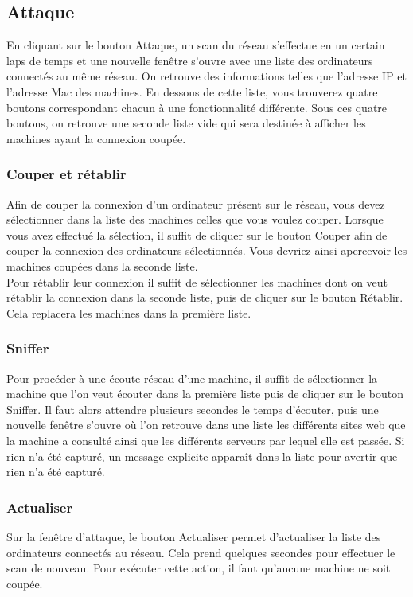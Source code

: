 \documentclass[11pt]{article}
\begin{document}
\subsection{Attaque}
En cliquant sur le bouton Attaque, un scan du réseau s'effectue en un certain laps de temps et une nouvelle fenêtre s'ouvre avec une liste des ordinateurs connectés au même réseau. On retrouve des informations telles que l'adresse IP et l'adresse Mac des machines. En dessous de cette liste, vous trouverez quatre boutons  correspondant chacun à une fonctionnalité différente. Sous ces quatre boutons, on retrouve une seconde liste vide qui sera destinée à afficher les machines ayant la connexion coupée.
\subsubsection{Couper et rétablir}
Afin de couper la connexion d'un ordinateur présent sur le réseau, vous devez sélectionner dans la liste des machines celles que vous voulez couper. Lorsque vous avez effectué la sélection, il suffit de cliquer sur le bouton Couper afin de couper la connexion des ordinateurs sélectionnés. Vous devriez ainsi apercevoir les machines coupées dans la seconde liste.~\\
Pour rétablir leur connexion il suffit de sélectionner les machines dont on veut rétablir la connexion dans la seconde liste, puis de cliquer sur le bouton Rétablir. Cela replacera les machines dans la première liste.

\subsubsection{Sniffer}
Pour procéder à une écoute réseau d'une machine, il suffit de sélectionner la machine que l'on veut écouter dans la première liste puis de cliquer sur le bouton Sniffer. Il faut alors attendre plusieurs secondes le temps d'écouter, puis une nouvelle fenêtre s'ouvre où l'on retrouve dans une liste les différents sites web que la machine a consulté ainsi que les différents serveurs par lequel elle est passée. Si rien n'a été capturé, un message explicite apparaît dans la liste pour avertir que rien n'a été capturé.

\subsubsection{Actualiser}
Sur la fenêtre d'attaque, le bouton Actualiser permet d'actualiser la liste des ordinateurs connectés au réseau. Cela prend quelques secondes pour effectuer le scan de nouveau. Pour exécuter cette action, il faut qu'aucune machine ne soit coupée.
\end{document}
